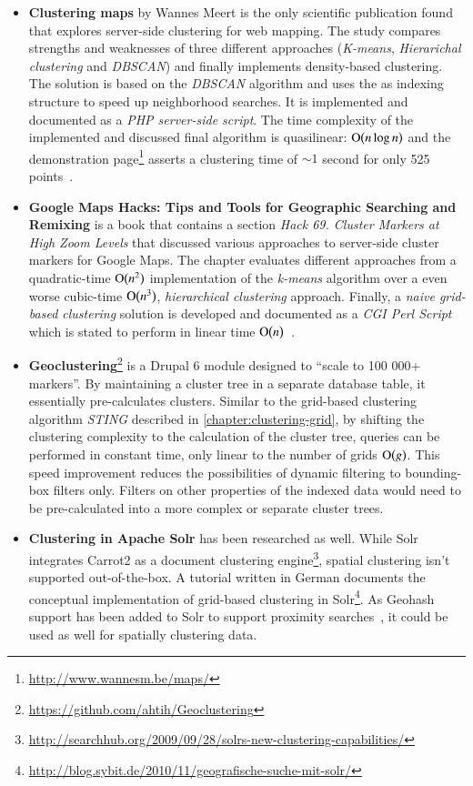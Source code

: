 \begin{itemize}

\item \textbf{Clustering maps} by Wannes Meert is the only scientific publication found that explores server-side clustering for web mapping. The study compares strengths and weaknesses of three different approaches (\textit{K-means}, \textit{Hierarichal clustering} and \textit{DBSCAN}) and finally implements density-based clustering. The solution is based on the \textit{DBSCAN} algorithm and uses the  as indexing structure to speed up neighborhood searches. It is implemented and documented as a \textit{PHP server-side script}. The time complexity of the implemented and discussed final algorithm is quasilinear: $\operatorname{O}\bigl(n \log{n}\bigr)$ and the demonstration page\footnote{\url{http://www.wannesm.be/maps/}} asserts a clustering time of $\sim 1$ second for only 525 points~\cite{Meert06clustermaps}.

\item \textbf{Google Maps Hacks: Tips and Tools for Geographic Searching and Remixing} is a book that contains a section \textit{Hack 69. Cluster Markers at High Zoom Levels} that discussed various approaches to server-side cluster markers for Google Maps. The chapter evaluates different approaches from a quadratic-time $\operatorname{O}\bigl(n^2\bigr)$ implementation of the \textit{k-means} algorithm over a even worse cubic-time $\operatorname{O}\bigl(n^3\bigr)$, \textit{hierarchical clustering} approach. Finally, a \textit{naive grid-based clustering} solution is developed and documented as a \textit{CGI Perl Script} which is stated to perform in linear time $\operatorname{O}\bigl(n\bigr)$~\cite{Gibson06Gmapshacks}.

\item \textbf{Geoclustering}\footnote{\url{https://github.com/ahtih/Geoclustering}} is a Drupal 6 module designed to ``scale to 100 000+ markers''. By maintaining a cluster tree in a separate database table, it essentially pre-calculates clusters. Similar to the grid-based clustering algorithm \textit{STING} described in \ref{chapter:clustering-grid}, by shifting the clustering complexity to the calculation of the cluster tree, queries can be performed in constant time, only linear to the number of grids $\operatorname{O}\bigl(g\bigr)$. This speed improvement reduces the possibilities of dynamic filtering to bounding-box filters only. Filters on other properties of the indexed data would need to be pre-calculated into a more complex or separate cluster trees.

\item \textbf{Clustering in Apache Solr} has been researched as well. While Solr integrates Carrot2 as a document clustering engine\footnote{\url{http://searchhub.org/2009/09/28/solrs-new-clustering-capabilities/}}, spatial clustering isn't supported out-of-the-box. A tutorial written in German documents the conceptual implementation of grid-based clustering in Solr\footnote{\url{http://blog.sybit.de/2010/11/geografische-suche-mit-solr/}}. As Geohash support has been added to Solr to support proximity searches~\cite{Smiley11geohash}, it could be used as well for spatially clustering data.  

\end{itemize}


